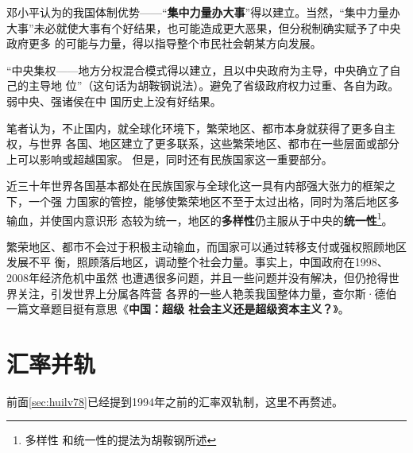 邓小平认为的我国体制优势——“\textbf{集中力量办大事}”得以建立。当然，“集中力量办
大事”未必就使大事有个好结果，也可能造成更大恶果，但分税制确实赋予了中央政府更多
的可能与力量，得以指导整个市民社会朝某方向发展。

“中央集权——地方分权混合模式得以建立，且以中央政府为主导，中央确立了自己的主导地
位”（这句话为胡鞍钢说法）。避免了省级政府权力过重、各自为政。弱中央、强诸侯在中
国历史上没有好结果。

笔者认为，不止国内，就全球化环境下，繁荣地区、都市本身就获得了更多自主权，与世界
各国、地区建立了更多联系，这些繁荣地区、都市在一些层面或部分上可以影响或超越国家。
但是，同时还有民族国家这一重要部分。

近三十年世界各国基本都处在民族国家与全球化这一具有内部强大张力的框架之下，一个强
力国家的管控，能够使繁荣地区不至于太过出格，同时为落后地区多输血，并使国内意识形
态较为统一，地区的\textbf{多样性}仍主服从于中央的\textbf{统一性}\footnote{多样性
  和统一性的提法为胡鞍钢所述}。

繁荣地区、都市不会过于积极主动输血，而国家可以通过转移支付或强权照顾地区发展不平
衡，照顾落后地区，调动整个社会力量。事实上，中国政府在1998、2008年经济危机中虽然
也遭遇很多问题，并且一些问题并没有解决，但仍抢得世界关注，引发世界上分属各阵营
各界的一些人艳羡我国整体力量，查尔斯·德伯一篇文章题目挺有意思《\textbf{中国：超级
  社会主义还是超级资本主义？}》。

\section{汇率并轨}

前面\cref{sec:huilv78}已经提到1994年之前的汇率双轨制，这里不再赘述。












